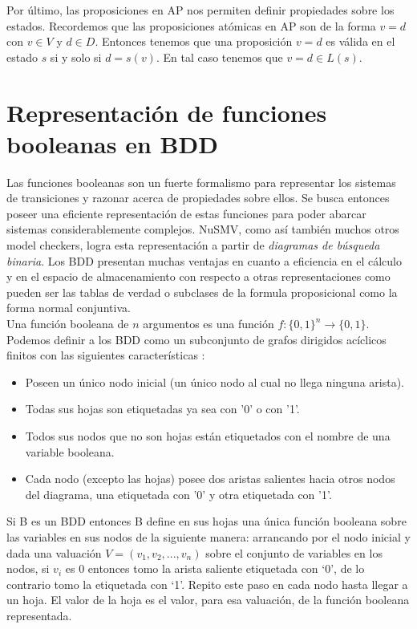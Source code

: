 \documentclass[titlepage, 12pt]{book}
\begin{document}
Por \'ultimo, las proposiciones en AP nos permiten definir propiedades sobre los estados. Recordemos que las proposiciones at\'omicas en AP son de la forma $v=d$ con $v \in V$ y $d \in D$. Entonces tenemos que una proposici\'on $v=d$ es v\'alida en el estado $s$ si y solo si $d = s(v)$. En tal caso tenemos que $v=d \in L(s)$.








\section{Representaci\'on de funciones booleanas en BDD}

Las funciones booleanas son un fuerte formalismo para representar los sistemas de transiciones y razonar acerca de propiedades sobre ellos. Se busca entonces poseer una eficiente representación de estas funciones para poder abarcar sistemas considerablemente complejos. NuSMV, como así también muchos otros model checkers, logra esta representación a partir de \textit{diagramas de búsqueda binaria}. Los BDD presentan muchas ventajas en cuanto a eficiencia en el cálculo y en el espacio de almacenamiento con respecto a otras representaciones como pueden ser las tablas de verdad o subclases de la formula proposicional como la forma normal conjuntiva.\\

Una función booleana de $n$ argumentos es una función $f : \{0,1\}^n \to \{0,1\}$. Podemos definir a los BDD como un subconjunto de grafos dirigidos acíclicos finitos con las siguientes características \cite{Huth}:
\begin{itemize}
\item Poseen un único nodo inicial (un único nodo al cual no llega ninguna arista).
\item Todas sus hojas son etiquetadas ya sea con '0' o con '1'.
\item Todos sus nodos que no son hojas están etiquetados con el nombre de una variable booleana.
\item Cada nodo (excepto las hojas) posee dos aristas salientes hacia otros nodos del diagrama, una etiquetada con '0' y otra etiquetada con '1'.
\end{itemize}

Si B es un BDD entonces B define en sus hojas una única función booleana sobre las variables en sus nodos de la siguiente manera: arrancando por el nodo inicial y dada una valuación $V=(v_1,v_2,...,v_n)$ sobre el conjunto de variables en los nodos, si $v_i$ es $0$ entonces tomo la arista saliente etiquetada con `0', de lo contrario tomo la etiquetada con `1'. Repito este paso en cada nodo hasta llegar a un hoja. El valor de la hoja es el valor, para esa valuación, de la función booleana representada.
\end{document}
